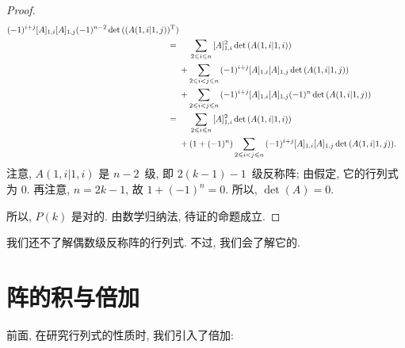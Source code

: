 \documentclass[../libro.tex]{subfiles}
\begin{document}
\begin{proof}
\begin{align*}
{            (-1)^{i+j}
            [A]_{1,i} [A]_{1,j}
            (-1)^{n-2} \det {((A(1,i|1,j))^{\mathrm{T}})}
        }
        \\
        = {} &
        \hphantom{{} + {}}
        \sum_{2 \leq i \leq n} {
            [A]_{1,i}^2 \det {(A(1,i|1,i))}
        }
        \\
        & +
        \sum_{2 \leq i < j \leq n} {
            (-1)^{i+j}
            [A]_{1,i} [A]_{1,j} \det {(A(1,i|1,j))}
        }
        \\
        & +
        \sum_{2 \leq i < j \leq n} {
            (-1)^{i+j}
            [A]_{1,i} [A]_{1,j}
            (-1)^{n} \det {(A(1,i|1,j))}
        }
        \\
        = {} &
        \hphantom{{} + {}}
        \sum_{2 \leq i \leq n} {
            [A]_{1,i}^2 \det {(A(1,i|1,i))}
        }
        \\
        & + (1 + (-1)^n)
        \sum_{2 \leq i < j \leq n} {
            (-1)^{i+j}
            [A]_{1,i} [A]_{1,j} \det {(A(1,i|1,j))}
        }.
    \end{align*}
    注意, \(A(1,i|1,i)\) 是 \(n - 2\)~级,
    即 \(2(k-1) - 1\)~级反称阵;
    由假定,
    它的行列式为 \(0\).
    再注意, \(n = 2k - 1\),
    故 \(1 + (-1)^n = 0\).
    所以, \(\det {(A)} = 0\).

    所以, \(P(k)\) 是对的.
    由数学归纳法, 待证的命题成立.
\end{proof}

我们还不了解偶数级反称阵的行列式.
不过, 我们会了解它的.

\section{阵的积与倍加}

前面, 在研究行列式的性质时,
我们引入了倍加:

\end{document}
